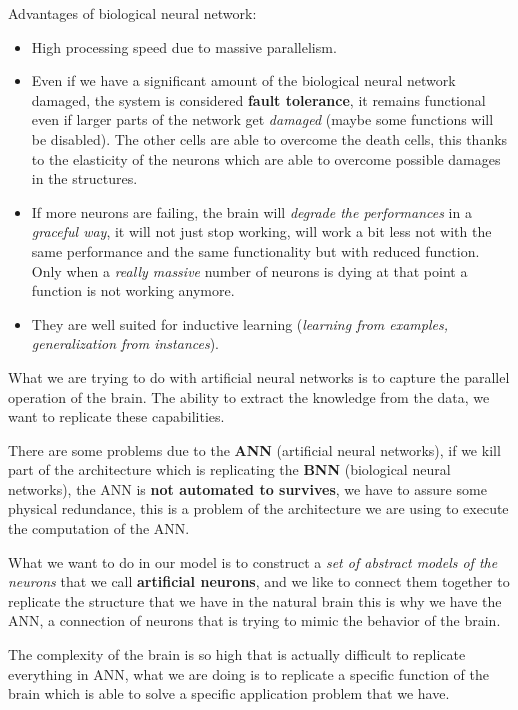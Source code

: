 \documentclass{article}
\begin{document}
Advantages of biological neural network:
\begin{itemize}
    \item High processing speed due to massive parallelism.

    \item Even if we have a significant amount of the biological neural network damaged, the system is
          considered \textbf{fault tolerance}, it remains functional even if larger parts of the network get \textit{damaged} (maybe some functions will be disabled).
          The other cells are able to overcome the death cells, this thanks to the elasticity of the neurons which are able
          to overcome possible damages in the structures.

    \item If more neurons are failing, the brain will \textit{degrade the performances} in a \textit{graceful way},
          it will not just stop working, will work a bit less not with the same performance and the same functionality
          but with reduced function. Only when a \textit{really massive} number of neurons is dying at that point a
          function is not working anymore.

    \item They are well suited for inductive learning (\textit{learning from examples, generalization from instances}).
\end{itemize}

What we are trying to do with artificial neural networks is to capture the parallel operation of the brain. The ability to
extract the knowledge from the data, we want to replicate these capabilities.

There are some problems due to the \textbf{ANN} (artificial neural networks), if we kill part of the architecture which
is replicating the \textbf{BNN} (biological neural networks), the ANN is \textbf{not automated to survives}, we have to
assure some physical redundance, this is a problem of the architecture we are using to execute the computation of the ANN.

What we want to do in our model is to construct a \textit{set of abstract models of the neurons} that we call
\textbf{artificial neurons}, and we like to connect them together to replicate the structure that we have in the
natural brain this is why we have the ANN, a connection of neurons that is trying to mimic the behavior of the brain.

The complexity of the brain is so high that is actually difficult to replicate everything in ANN,
what we are doing is to replicate a specific function of the brain which is able to solve a specific application
problem that we have.
\end{document}
